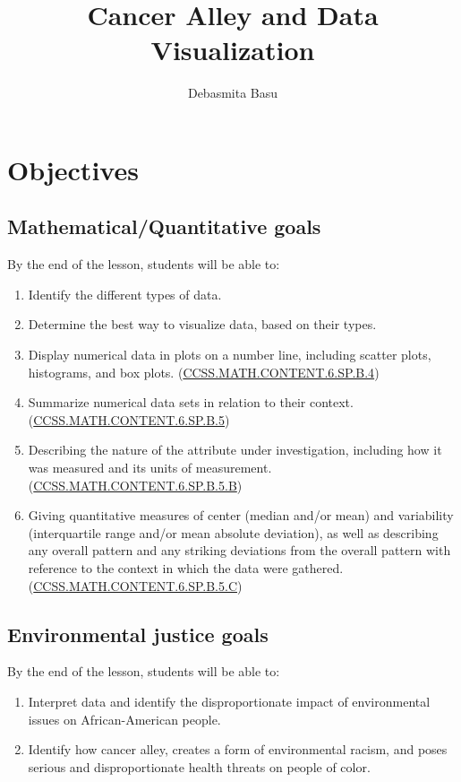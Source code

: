 \documentclass[a4paper, 11pt]{article}
\title{Cancer Alley and Data Visualization}
\author{Debasmita Basu}
\begin{document}
	\begin{titlepage}
		\maketitle
	\end{titlepage}
	\tableofcontents
	\thispagestyle{empty}
	\clearpage
	\setcounter{page}{1}
%
%
%
%
\section{Objectives}
%
%
\subsection{Mathematical/Quantitative goals}
%
	By the end of the lesson, students will be able to:
	\begin{enumerate}[label=(\alph*), noitemsep]
		\item 
				Identify the different types of data.
		\item 
				Determine the best way to visualize data, based on their types.
		\item 
				Display numerical data in plots on a number line, including scatter plots, histograms, and box plots. (\hyperlink{http://www.corestandards.org/Math/Content/6/SP/B/4/}{CCSS.MATH.CONTENT.6.SP.B.4})
		\item 
				Summarize numerical data sets in relation to their context.\\ (\hyperlink{http://www.corestandards.org/Math/Content/6/SP/B/5/}{CCSS.MATH.CONTENT.6.SP.B.5})
		\item 
				Describing the nature of the attribute under investigation, including how it was measured and its units of measurement. (\hyperlink{http://www.corestandards.org/Math/Content/6/SP/B/5/b/}{CCSS.MATH.CONTENT.6.SP.B.5.B})
		\item 
				Giving quantitative measures of center (median and/or mean) and variability (interquartile range and/or mean absolute deviation), as well as describing any overall pattern and any striking deviations from the overall pattern with reference to the context in which the data were gathered. (\hyperlink{http://www.corestandards.org/Math/Content/6/SP/B/5/c/}{CCSS.MATH.CONTENT.6.SP.B.5.C})
	\end{enumerate}
%
%
\subsection{Environmental justice goals}
%
	By the end of the lesson, students will be able to:
	\begin{enumerate}[label=(\alph*), noitemsep]
		\item 
				Interpret data and identify the disproportionate impact of environmental issues on African-American people.
		\item 
				Identify how cancer alley, creates a form of environmental racism, and poses serious and disproportionate health threats on people of color.
	\end{enumerate}
%
%
%
%
\end{document}
